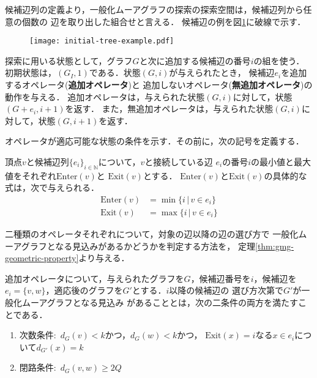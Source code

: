 候補辺列の定義より，一般化ムーアグラフの探索の探索空間は，候補辺列から任意の個数の
辺を取り出した組合せと言える．
候補辺の例を図\ref{fig:feasible-edges-example}に破線で示す．

\begin{figure}
  \centering
  \begin{minipage}{.45\columnwidth}
    \texttt{[image: initial-tree-example.pdf]}
    \label{fig:initial-tree-example}
  \end{minipage}
  \hfill
  \begin{minipage}{.45\columnwidth}
    \def\svgwidth{\textwidth}
    
    \label{fig:feasible-edges-example}
  \end{minipage}
\end{figure}

探索に用いる状態として，グラフ$G$と次に追加する候補辺の番号$i$の組を使う．
初期状態は，$(G_I,1)$である．状態$(G,i)$が与えられたとき，
候補辺$e_i$を追加するオペレータ(\textbf{追加オペレータ})と
追加しないオペレータ(\textbf{無追加オペレータ})の動作を与える．
追加オペレータは，与えられた状態$(G,i)$に対して，状態$(G+e_i,i+1)$を返す．
また，無追加オペレータは，与えられた状態$(G,i)$に対して，状態$(G,i+1)$を返す．

オペレータが適応可能な状態の条件を示す．その前に，次の記号を定義する．
\begin{definition}\rm
  頂点$v$と候補辺列$\{e_i\}_{i\in\mathbb{N}}$について，$v$と接続している辺
  $e_i$の番号$i$の最小値と最大値をそれぞれ$\text{Enter}(v)$と
  $\text{Exit}(v)$とする．
  $\text{Enter}(v)$と$\text{Exit}(v)$の具体的な式は，次で与えられる．
  \begin{equation}
    \label{eq:frontier}
    \begin{aligned}
    \text{Enter}(v) &= \min\{i\,|\,v\in e_i\} \\
    \text{Exit}(v) &= \max\{i\,|\,v\in e_i\}
    \end{aligned}
  \end{equation}
\end{definition}

二種類のオペレータそれぞれについて，対象の辺以降の辺の選び方で
一般化ムーアグラフとなる見込みがあるかどうかを判定する方法を，
定理\ref{thm:gmg-geometric-property}より与える．

\begin{corollary-without-proof}\rm
  \label{coll:basic-add-operator}
  追加オペレータについて，与えられたグラフを$G$，候補辺番号を$i$，候補辺を
  $e_i=\{v,w\}$，適応後のグラフを$G'$とする．$i$以降の候補辺の
  選び方次第で$G'$が一般化ムーアグラフとなる見込み
  があることとは，次の二条件の両方を満たすことである．
  \begin{enumerate}
  \item 次数条件:\ $d_G(v)<k$かつ，$d_G(w)<k$かつ，
    $\text{Exit}(x)=i$なる$x\in e_i$について$d_{G'}(x)=k$
  \item 閉路条件:\ $d_G(v,w)\geq2Q$
  \end{enumerate}
\end{corollary-without-proof}

